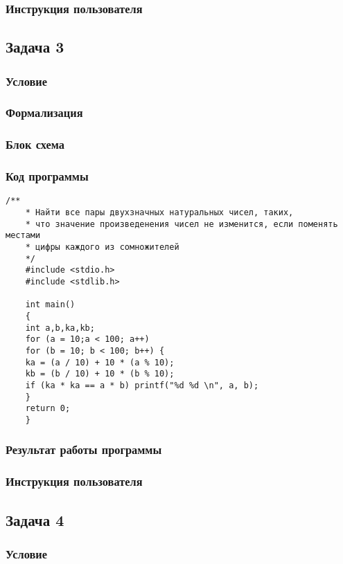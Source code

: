 \documentclass[simple,14pt]{eskdtext}
\begin{document}
	\subsubsection{Инструкция пользователя}
	
	\subsection{Задача 3}
	\subsubsection{Условие}
	\subsubsection{Формализация}
	\subsubsection{Блок схема}
	\subsubsection{Код программы}
	\begin{lstlisting}[label=some-code3,caption=Задача 3]
	/**
	* Найти все пары двухзначных натуральных чисел, таких,
	* что значение произведенения чисел не изменится, если поменять местами
	* цифры каждого из сомножителей
	*/
	#include <stdio.h>
	#include <stdlib.h>
	
	int main()
	{
	int a,b,ka,kb;
	for (a = 10;a < 100; a++)
	for (b = 10; b < 100; b++) {
	ka = (a / 10) + 10 * (a % 10);
	kb = (b / 10) + 10 * (b % 10);
	if (ka * ka == a * b) printf("%d %d \n", a, b);
	}
	return 0;
	}
	\end{lstlisting}
	\subsubsection{Результат работы программы}
	\subsubsection{Инструкция пользователя}
	
	\subsection{Задача 4}
	\subsubsection{Условие}
\end{document}
